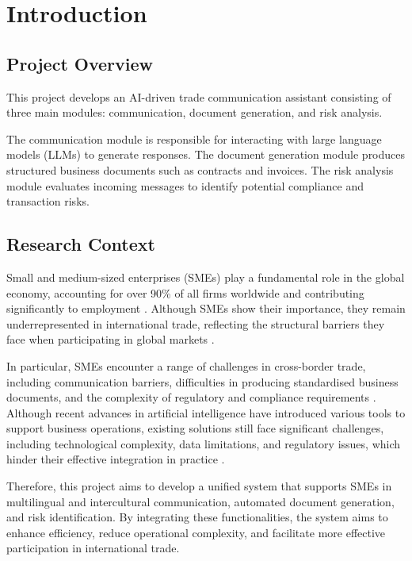 \documentclass[12pt,a4paper]{report}
\begin{document}
%

\chapter{Introduction}

\section{Project Overview}

This project develops an AI-driven trade communication assistant consisting of three main modules: communication, document generation, and risk analysis.

The communication module is responsible for interacting with large language models (LLMs) to generate responses. The document generation module produces structured business documents such as contracts and invoices. The risk analysis module evaluates incoming messages to identify potential compliance and transaction risks.

\section{Research Context}

Small and medium-sized enterprises (SMEs) play a fundamental role in the global economy, accounting for over 90\% of all firms worldwide and contributing significantly to employment \citep{wto2016, worldbank2020}. Although SMEs show their importance, they remain underrepresented in international trade, reflecting the structural barriers they face when participating in global markets \citep{wto2016,oecd2017}.

In particular, SMEs encounter a range of challenges in cross-border trade, including communication barriers, difficulties in producing standardised business documents, and the complexity of regulatory and compliance requirements \citep{oecd2017, unctad2021}. Although recent advances in artificial intelligence have introduced various tools to support business operations, existing solutions still face significant challenges, including technological complexity, data limitations, and regulatory issues, which hinder their effective integration in practice \citep{ozturk2024}.

Therefore, this project aims to develop a unified system that supports SMEs in multilingual and intercultural communication, automated document generation, and risk identification. By integrating these functionalities, the system aims to enhance efficiency, reduce operational complexity, and facilitate more effective participation in international trade.
\end{document}
